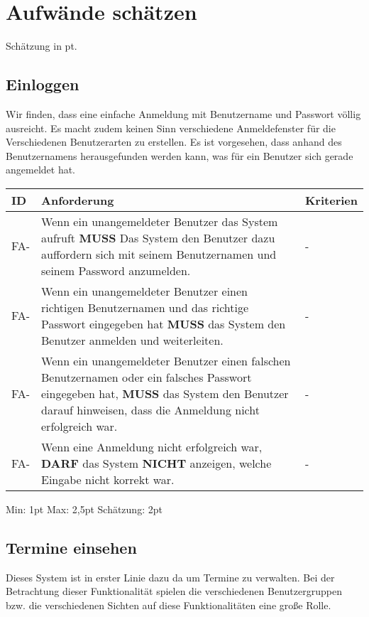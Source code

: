 
\clearpage

\section{Aufwände schätzen}
Schätzung in pt.

\vspace{18pt}

\subsection{Einloggen}
Wir finden, dass eine einfache Anmeldung mit Benutzername und Passwort völlig ausreicht. Es macht zudem keinen Sinn verschiedene Anmeldefenster für die Verschiedenen Benutzerarten zu erstellen. Es ist vorgesehen, dass anhand des Benutzernamens herausgefunden werden kann, was für ein Benutzer sich gerade angemeldet hat.

\vspace{12pt}

\begin{tabular} {|p{}|p{11cm}|p{}|}
	\hline
	ID & Anforderung & Kriterien \\
	\hline
	FA-
	& Wenn ein unangemeldeter Benutzer das System aufruft \textbf{MUSS} Das System den Benutzer dazu auffordern sich mit seinem Benutzernamen und seinem Password anzumelden.
	& - \\
	\hline
	FA- 
	& Wenn ein unangemeldeter Benutzer einen richtigen Benutzernamen und das richtige Passwort eingegeben hat \textbf{MUSS} das System den Benutzer anmelden und weiterleiten.
	& -  \\
	\hline
	FA- 
	& Wenn ein unangemeldeter Benutzer einen falschen Benutzernamen oder ein falsches Passwort eingegeben hat, \textbf{MUSS} das System den Benutzer darauf hinweisen, dass die Anmeldung nicht erfolgreich war.
	& - \\
	\hline
	FA-
	& Wenn eine Anmeldung nicht erfolgreich war, \textbf{DARF} das System \textbf{NICHT} anzeigen, welche Eingabe nicht korrekt war.
	& - \\
	\hline
\end{tabular}
Min: 1pt
Max: 2,5pt
Schätzung: 2pt

\newpage

\subsection{Termine einsehen}
Dieses System ist in erster Linie dazu da um Termine zu verwalten. Bei der Betrachtung dieser Funktionalität spielen die verschiedenen Benutzergruppen bzw. die verschiedenen Sichten auf diese Funktionalitäten eine große Rolle. 

